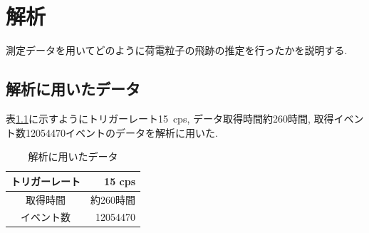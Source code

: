 \chapter{解析}\label{analysis}
測定データを用いてどのように荷電粒子の飛跡の推定を行ったかを説明する.

\section{解析に用いたデータ}\label{sec:anal:data}
表\ref{tab:analyzed_data}に示すようにトリガーレート15\ cps, データ取得時間約260時間, 取得イベント数12054470イベントのデータを解析に用いた.
\begin{table}[H]
    \centering
    \caption{解析に用いたデータ}
    \label{tab:analyzed_data}
    \begin{tabular}{|c|r|}
        \hline
        トリガーレート & 15 cps    \\ \hline
        取得時間       & 約260時間 \\ \hline
        イベント数     & 12054470  \\ \hline
    \end{tabular}
\end{table}

